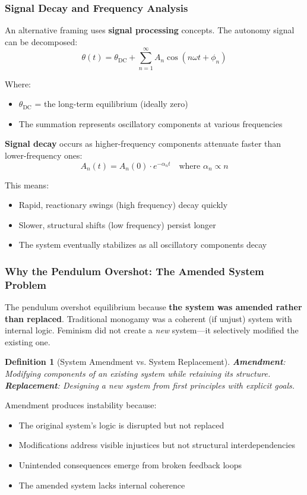 \documentclass[12pt, letterpaper]{article}
\newtheorem{definition}{Definition}[section]
\begin{document}
\subsubsection{Signal Decay and Frequency Analysis}

An alternative framing uses \textbf{signal processing} concepts. The autonomy signal can be decomposed:
\[
\theta(t) = \theta_{\text{DC}} + \sum_{n=1}^{\infty} A_n \cos(n\omega t + \phi_n)
\]

Where:
\begin{itemize}
    \item $\theta_{\text{DC}}$ = the long-term equilibrium (ideally zero)
    \item The summation represents oscillatory components at various frequencies
\end{itemize}

\textbf{Signal decay} occurs as higher-frequency components attenuate faster than lower-frequency ones:
\[
A_n(t) = A_n(0) \cdot e^{-\alpha_n t} \quad \text{where } \alpha_n \propto n
\]

This means:
\begin{itemize}
    \item Rapid, reactionary swings (high frequency) decay quickly
    \item Slower, structural shifts (low frequency) persist longer
    \item The system eventually stabilizes as all oscillatory components decay
\end{itemize}

\subsubsection{Why the Pendulum Overshot: The Amended System Problem}

The pendulum overshot equilibrium because \textbf{the system was amended rather than replaced}. Traditional monogamy was a coherent (if unjust) system with internal logic. Feminism did not create a \textit{new} system---it selectively modified the existing one.

\begin{definition}[System Amendment vs. System Replacement]
\textbf{Amendment}: Modifying components of an existing system while retaining its structure.\\
\textbf{Replacement}: Designing a new system from first principles with explicit goals.
\end{definition}

Amendment produces instability because:
\begin{itemize}
    \item The original system's logic is disrupted but not replaced
    \item Modifications address visible injustices but not structural interdependencies
    \item Unintended consequences emerge from broken feedback loops
    \item The amended system lacks internal coherence
\end{itemize}
\end{document}
